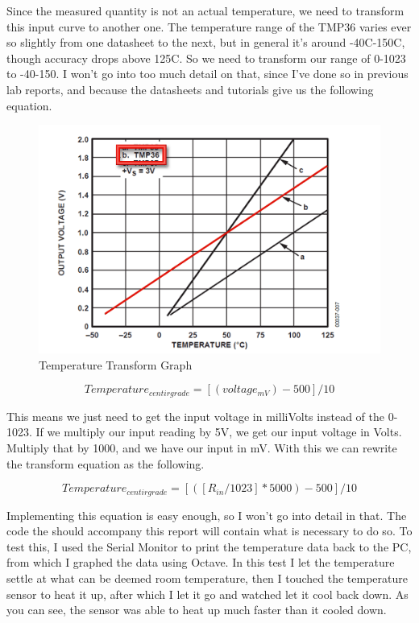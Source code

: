 \documentclass[prb,preprint]{revtex4-1}
\begin{document}
Since the measured quantity is not an actual temperature, we need to transform this input curve to another one. The temperature range of the TMP36 varies ever so slightly from one datasheet to the next, but in general it's around -40C-150C, though accuracy drops above 125C. So we need to transform our range of 0-1023 to -40-150. I won't go into too much detail on that, since I've done so in previous lab reports, and because the datasheets and tutorials give us the following equation.

\begin{figure}[H]
	\centering
	\includegraphics[width=5.75in]{tmp36graph.png}
	\caption{Temperature Transform Graph}
	\label{fig1}
\end{figure}


\begin{equation}
Temperature_{centirgrade} = [(voltage_{mV}) - 500] / 10
\end{equation}

This means we just need to get the input voltage in milliVolts instead of the 0-1023. If we multiply our input reading by 5V, we get our input voltage in Volts. Multiply that by 1000, and we have our input in mV. With this we can rewrite the transform equation as the following.


\begin{equation}
Temperature_{centirgrade} = [([R_{in}/1023] * 5000) - 500] / 10
\end{equation}

Implementing this equation is easy enough, so I won't go into detail in that. The code the should accompany this report will contain what is necessary to do so. To test this, I used the Serial Monitor to print the temperature data back to the PC, from which I graphed the data using Octave. In this test I let the temperature settle at what can be deemed room temperature, then I touched the temperature sensor to heat it up, after which I let it go and watched let it cool back down. As you can see, the sensor was able to heat up much faster than it cooled down.
\end{document}

